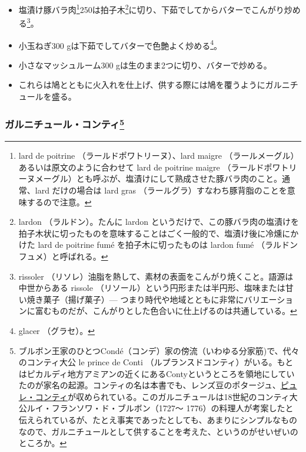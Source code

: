 \begin{recette}
\begin{itemize}
\item
  塩漬け豚バラ肉\footnote{lard de poitrine
    （ラールドポワトリーヌ）、lard maigre
    （ラールメーグル）あるいは原文のように合わせて lard de poitrine
    maigre
    （ラールドポワトリーヌメーグル）とも呼ぶが、塩漬けにして熟成させた豚バラ肉のこと。通常、lard
    だけの場合は lard gras
    （ラールグラ）すなわち豚背脂のことを意味するので注意。}250は拍子木\footnote{lardon
    （ラルドン）。たんに lardon
    というだけで、この豚バラ肉の塩漬けを拍子木状に切ったものを意味することはごく一般的で、塩漬け後に冷燻にかけた
    lard de poitrine fumé を拍子木に切ったものは lardon fumé
    （ラルドンフュメ）と呼ばれる。}に切り、下茹でしてからバターでこんがり炒める\footnote{rissoler
    （リソレ）油脂を熱して、素材の表面をこんがり焼くこと。語源は中世からある
    rissole
    （リソール）という円形または半円形、塩味または甘い焼き菓子（揚げ菓子）---
    つまり時代や地域とともに非常にバリエーションに富むものだが、こんがりとした色合いに仕上げるのは共通している。}。
\item
  小玉ねぎ300 gは下茹でしてバターで色艶よく炒める\footnote{glacer
    （グラセ）。}。
\item
  小さなマッシュルーム300 gは生のまま2つに切り、バターで炒める。
\item
  これらは鳩とともに火入れを仕上げ、供する際には鳩を覆うようにガルニチュールを盛る。
\end{itemize}

\atoaki{}

\hypertarget{garniture-conti}{%
\subsubsection[ガルニチュール・コンティ]{\texorpdfstring{ガルニチュール・コンティ\footnote{ブルボン王家のひとつCondé（コンデ）家の傍流（いわゆる分家筋)で、代々のコンティ大公
  le prince de Conti
  （ルプランスドコンティ）がいる。もとはピカルディ地方アミアンの近くにあるContyというところを領地にしていたのが家名の起源。コンティの名は本書でも、レンズ豆のポタージュ、\protect\hyperlink{puree-conti}{ピュレ・コンティ}が収められている。このガルニチュールは18世紀のコンティ大公ルイ・フランソワ・ド・ブルボン（1727〜
  1776）の料理人が考案したと伝えられているが、たとえ事実であったとしても、あまりにシンプルなものなので、ガルニチュールとして供することを考えた、というのがせいぜいのところか。}}{ガルニチュール・コンティ}}\label{garniture-conti}}



\end{recette}
